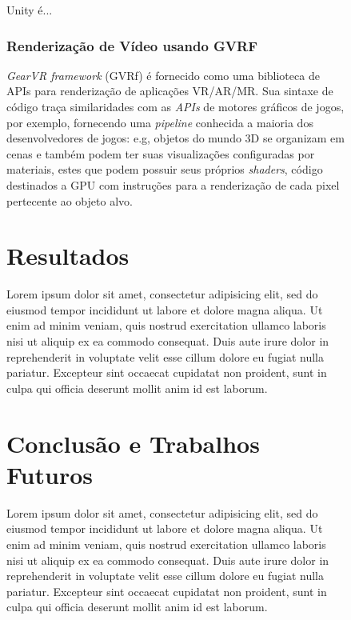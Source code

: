 \documentclass[sigconf]{acmart}
\begin{document}
\begin{figure}[h!]

Unity é...


\subsubsection{Renderização de Vídeo usando GVRF}

\textit{GearVR framework} (GVRf) é fornecido como uma biblioteca de APIs para renderização de aplicações VR/AR/MR. Sua sintaxe de código traça similaridades com as \textit{APIs} de motores gráficos de jogos, por exemplo, fornecendo uma \textit{pipeline} conhecida a maioria dos desenvolvedores de jogos: e.g, objetos do mundo 3D se organizam em cenas e também podem ter suas visualizações configuradas por materiais, estes que podem possuir seus próprios \textit{shaders}, código destinados a GPU com instruções para a renderização de cada pixel pertecente ao objeto alvo.


\section{Resultados} \label{sec-results}


Lorem ipsum dolor sit amet, consectetur adipisicing elit, sed do eiusmod
tempor incididunt ut labore et dolore magna aliqua. Ut enim ad minim veniam,
quis nostrud exercitation ullamco laboris nisi ut aliquip ex ea commodo
consequat. Duis aute irure dolor in reprehenderit in voluptate velit esse
cillum dolore eu fugiat nulla pariatur. Excepteur sint occaecat cupidatat non
proident, sunt in culpa qui officia deserunt mollit anim id est laborum.

\section{Conclusão e Trabalhos Futuros} \label{sec-conclusion}


Lorem ipsum dolor sit amet, consectetur adipisicing elit, sed do eiusmod
tempor incididunt ut labore et dolore magna aliqua. Ut enim ad minim veniam,
quis nostrud exercitation ullamco laboris nisi ut aliquip ex ea commodo
consequat. Duis aute irure dolor in reprehenderit in voluptate velit esse
cillum dolore eu fugiat nulla pariatur. Excepteur sint occaecat cupidatat non
proident, sunt in culpa qui officia deserunt mollit anim id est laborum.


\end{figure}
\end{document}
